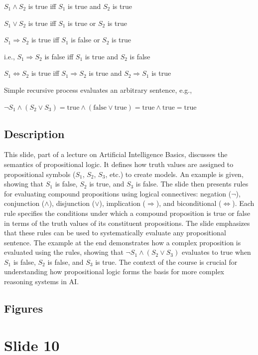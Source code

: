 \documentclass{article}%
\begin{document}
$S_1 \land S_2$ is true iff $S_1$ is true and $S_2$ is true

$S_1 \lor S_2$ is true iff $S_1$ is true or $S_2$ is true

$S_1 \Rightarrow S_2$ is true iff $S_1$ is false or $S_2$ is true

i.e., $S_1 \Rightarrow S_2$ is false iff $S_1$ is true and $S_2$ is false

$S_1 \Leftrightarrow S_2$ is true iff $S_1 \Rightarrow S_2$ is true and $S_2 \Rightarrow S_1$ is true

Simple recursive process evaluates an arbitrary sentence, e.g.,

$\neg S_1 \land (S_2 \lor S_3) = \text{true} \land (\text{false} \lor \text{true}) = \text{true} \land \text{true} = \text{true}$
%
\subsection{Description}%
This slide, part of a lecture on Artificial Intelligence Basics, discusses the semantics of propositional logic.  It defines how truth values are assigned to propositional symbols ($S_1$, $S_2$, $S_3$, etc.) to create models.  An example is given, showing that $S_1$ is false, $S_2$ is true, and $S_3$ is false.  The slide then presents rules for evaluating compound propositions using logical connectives: negation ($\neg$), conjunction ($\land$), disjunction ($\lor$), implication ($\Rightarrow$), and biconditional ($\Leftrightarrow$).  Each rule specifies the conditions under which a compound proposition is true or false in terms of the truth values of its constituent propositions.  The slide emphasizes that these rules can be used to systematically evaluate any propositional sentence.  The example at the end demonstrates how a complex proposition is evaluated using the rules, showing that $\neg S_1 \land (S_2 \lor S_3)$ evaluates to true when $S_1$ is false, $S_2$ is false, and $S_3$ is true. The context of the course is crucial for understanding how propositional logic forms the basis for more complex reasoning systems in AI.%
\subsection{Figures}%
\begin{figure}[H]%
\centering%
\end{figure}

%
\newpage%
\section{Slide 10}%
\label{sec:Slide10}%
\end{document}
